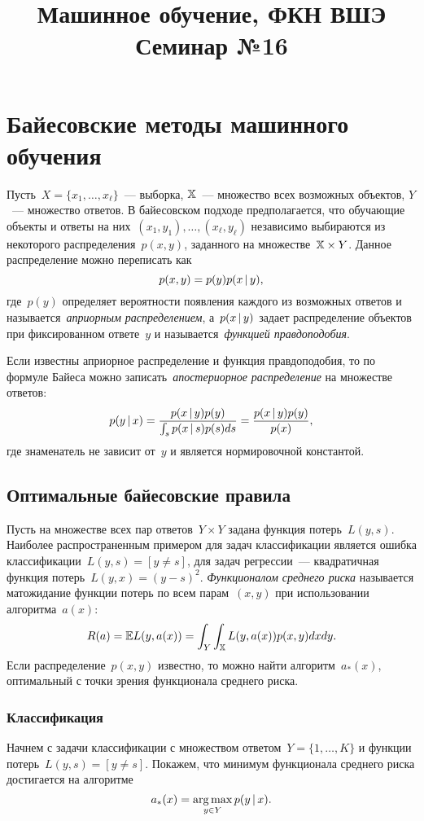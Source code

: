 \documentclass[12pt,fleqn]{article}
\title{Машинное обучение, ФКН ВШЭ\\Семинар №16}
\author{}
\date{}
\begin{document}
    \maketitle


\section{Байесовские методы машинного обучения}

Пусть~$X = \{x_1, \dots, x_\ell\}$~--- выборка,
$\mathbb{X}$~--- множество всех возможных объектов,
$Y$~--- множество ответов.
В байесовском подходе предполагается, что обучающие
объекты и ответы на них~$(x_1, y_1), \dots, (x_\ell, y_\ell)$ независимо выбираются
из некоторого распределения~$p(x, y)$, заданного на множестве~$\XX \times Y$.
Данное распределение можно переписать как
\[
    p(x, y)
    =
    p(y) p(x \mspace{3mu}{|}\mspace{3mu} y),
\]
где~$p(y)$ определяет вероятности появления каждого из возможных ответов
и называется~\emph{априорным распределением},
а~$p(x \mspace{3mu}{|}\mspace{3mu} y)$ задает распределение объектов при фиксированном ответе~$y$
и называется~\emph{функцией правдоподобия}.

Если известны априорное распределение и функция правдоподобия,
то по формуле Байеса можно записать~\emph{апостериорное распределение}
на множестве ответов:
\[
    p(y \mspace{3mu}{|}\mspace{3mu} x)
    =
    \frac{
        p(x \mspace{3mu}{|}\mspace{3mu} y) p(y)
    }{
        \int_s p(x \mspace{3mu}{|}\mspace{3mu} s) p(s) ds
    }
    =
    \frac{
        p(x \mspace{3mu}{|}\mspace{3mu} y) p(y)
    }{
        p(x)
    },
\]
где знаменатель не зависит от~$y$ и является нормировочной константой.

\subsection{Оптимальные байесовские правила}

Пусть на множестве всех пар ответов~$Y \times Y$ задана функция
потерь~$L(y, s)$. Наиболее распространенным примером для задач классификации является ошибка классификации~$L(y, s) = [y \neq s]$, для задач регрессии~--- квадратичная функция потерь~$L(y, x) = (y - s)^2$. \emph{Функционалом среднего риска} называется матожидание функции потерь по всем парам~$(x, y)$ при использовании алгоритма~$a(x)$:
\[
    R(a) = \mathbb{E} L(y, a(x))
    =
    \int_{Y} \int_{\mathbb{X}} L(y, a(x)) p(x, y) dx dy.
\]
Если распределение~$p(x, y)$ известно, то можно найти алгоритм~$a_*(x)$, оптимальный с точки зрения функционала среднего риска.

\subsubsection{Классификация}
Начнем с задачи классификации с множеством ответом~$Y = \{1, \dots, K\}$
и функции потерь~$L(y, s) = [y \neq s]$.
Покажем, что минимум функционала среднего риска достигается
на алгоритме
\[
    a_*(x) = \mathop{\rm arg\,max}\limits_{y \in Y} p(y \mspace{3mu}{|}\mspace{3mu} x).
\]
\end{document}
